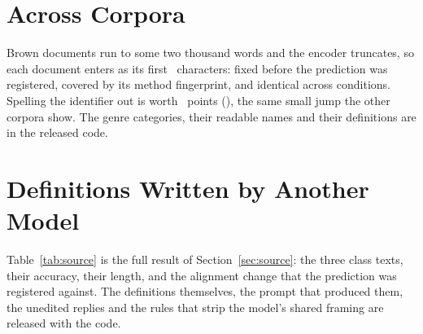 \documentclass[11pt]{article}
\begin{document}
\section{Across Corpora}
\label{app:brown}







Brown documents run to some two thousand words and the encoder truncates, so
each document enters as its first \BrownTruncate\ characters: fixed before the
prediction was registered, covered by its method fingerprint, and identical
across conditions. Spelling the identifier out is worth
\BrownSpellGain~points (\BrownSpellPStat), the same small jump the other
corpora show. The genre categories, their readable names and their definitions
are in the released code.

\section{Definitions Written by Another Model}
\label{app:source}

Table~\ref{tab:source} is the full result of Section~\ref{sec:source}: the
three class texts, their accuracy, their length, and the alignment change that
the prediction was registered against. The definitions themselves, the prompt
that produced them, the unedited replies and the rules that strip the model's
shared framing are released with the code.


\end{document}
